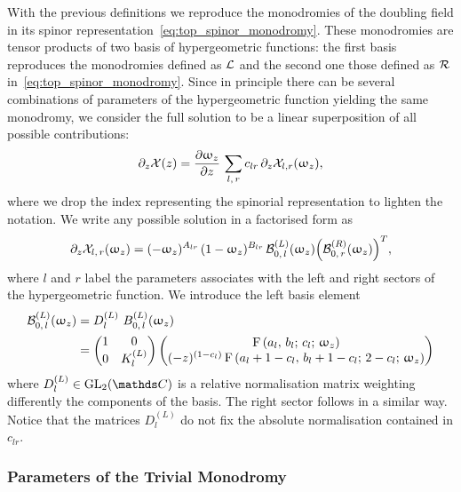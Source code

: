 With the previous definitions we reproduce the monodromies of the doubling field in its spinor representation~\eqref{eq:top_spinor_monodromy}.\footnotemark{}
These monodromies are tensor products of two basis of hypergeometric functions: the first basis reproduces the monodromies defined as $\mathcal{L}$ and the second one those defined as $\mathcal{R}$ in~\eqref{eq:top_spinor_monodromy}.
Since in principle there can be several combinations of parameters of the hypergeometric function yielding the same monodromy, we consider the full solution to be a linear superposition of all possible contributions:
\begin{equation}
  \ipd{z} \cX(z)
  =
  \pdv{\omega_z}{z}\,
  \sum\limits_{l,\, r}
  c_{lr}\,
  \ipd{z} \cX_{l,r}(\omega_z),
  \label{eq:formal_solution}
\end{equation}
where we drop the index representing the spinorial representation to lighten the notation.
We write any possible solution in a factorised form as
\begin{equation}
  \partial_{z} \mathcal{X}_{l,\,r}(\upomega_z)
  =
  (-\upomega_z)^{A_{lr}}\,
  (1-\upomega_z)^{B_{lr}}\,
  \mathcal{B}_{0,\, l}^{(L)}(\upomega_z)
  \qty( \mathcal{B}_{0,\, r}^{(R)}(\upomega_z) )^T,
  \label{eq:formal_solution_lr}
\end{equation}
where  $l$ and $r$ label the parameters associates with the left and right sectors of the hypergeometric function.
We introduce the left basis element
\begin{equation}
  \begin{split}
    \cB_{0,\, l}^{(L)}(\omega_z)
    & =
    D^{(L)}_l~
    B_{0,\,l}^{(L)}(\omega_z)
    \\
    & =
    \mqty( 1 & 0 \\ 0 & K_l^{(L)} )\,
    \mqty(
      \hyp{a_l}{b_l}{c_l}{\omega_z}
      \\
      (-z)^{(1-c_l)}\,
      \hyp{a_l+1-c_l}{b_l+1-c_l}{2-c_l}{\omega_z}
    )
  \end{split}
\end{equation}
where $D_l^{(L)} \in \GL{2}{\C}$ is a relative normalisation matrix weighting differently the components of the basis.\footnotemark{}
The right sector follows in a similar way.
Notice that the matrices $D^{(L)}_l$ do not fix the absolute normalisation contained in $c_{lr}$.


\subsubsection{Parameters of the Trivial Monodromy}

